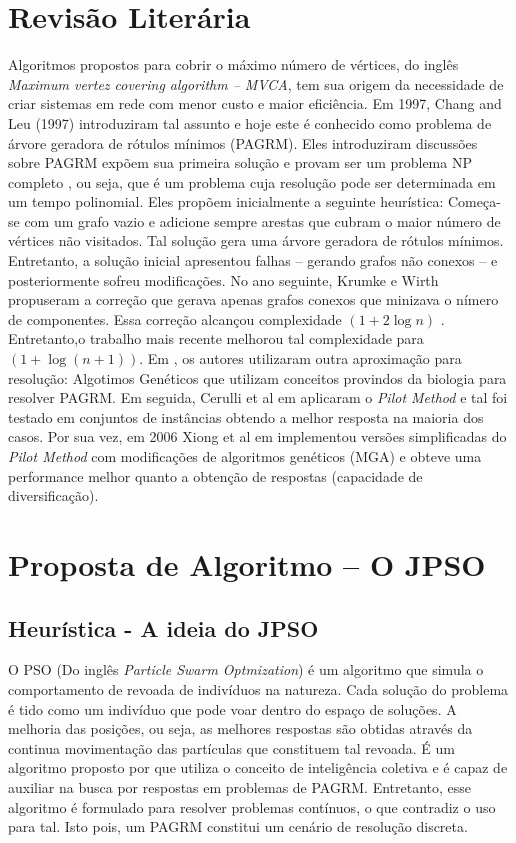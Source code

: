 \documentclass{sig-alternate-05-2015}
\begin{document}
\section{Revisão Literária} \label{sec2}
Algoritmos propostos para cobrir o máximo número de vértices, do inglês \textit{Maximum vertez covering algorithm -- MVCA}, tem sua origem da necessidade de criar sistemas em rede com menor custo e maior eficiência. Em 1997, Chang and Leu (1997) \cite{chang1997minimum} introduziram tal assunto e hoje este é conhecido como problema de árvore geradora de rótulos mínimos (PAGRM).
Eles introduziram discussões sobre PAGRM expõem  sua primeira solução e provam ser um problema NP completo \cite{Ladner:1975:SPT:321864.321877}, ou seja, que é um problema cuja resolução pode ser determinada em um tempo polinomial. Eles propõem inicialmente a seguinte heurística: Começa-se com um grafo vazio e adicione sempre arestas que cubram o maior número de vértices não visitados. Tal solução gera uma árvore geradora de rótulos mínimos. Entretanto, a solução inicial apresentou falhas -- gerando grafos não conexos -- e posteriormente sofreu modificações.
No ano seguinte, Krumke e Wirth \cite{krumke1998minimum} propuseram a correção que gerava apenas grafos conexos que minizava o nímero de componentes. Essa correção alcançou complexidade $(1 + 2 \log{n})$ . Entretanto,o trabalho mais recente \cite{wan2002note} melhorou tal complexidade para $ ( 1 + \log {(n + 1)}) $.
Em \cite{xiong2005one}, os autores utilizaram outra aproximação para resolução: Algotimos Genéticos que utilizam conceitos provindos da biologia para resolver PAGRM. Em seguida, Cerulli et al em \cite{cerulli2005metaheuristics} aplicaram o \textit{Pilot Method} e tal foi testado em conjuntos de instâncias obtendo a melhor resposta na maioria dos casos. Por sua vez, em 2006 Xiong et al em \cite{xiong2006improved} implementou versões simplificadas do \textit{Pilot Method} com modificações  de algoritmos genéticos (MGA) e obteve uma performance melhor quanto a obtenção de respostas (capacidade de diversificação). 
\section{Proposta de Algoritmo -- O JPSO} \label{sec3}

\subsection{Heurística - A ideia do JPSO}

O PSO (Do inglês \textit{Particle Swarm Optmization}) é um algoritmo que simula o comportamento de revoada de indivíduos na natureza. Cada solução do problema  é tido como um indivíduo que pode voar dentro do espaço de soluções. A melhoria das posições, ou seja, as melhores respostas são obtidas através da continua movimentação das partículas que constituem tal revoada. É um algoritmo proposto por \cite{consoli2008discrete} que utiliza o conceito de inteligência coletiva e é capaz de auxiliar na busca por respostas em problemas de PAGRM. Entretanto, esse algoritmo é formulado para resolver problemas contínuos, o que contradiz o uso para tal. Isto pois, um PAGRM constitui um cenário de resolução discreta.
\end{document}
